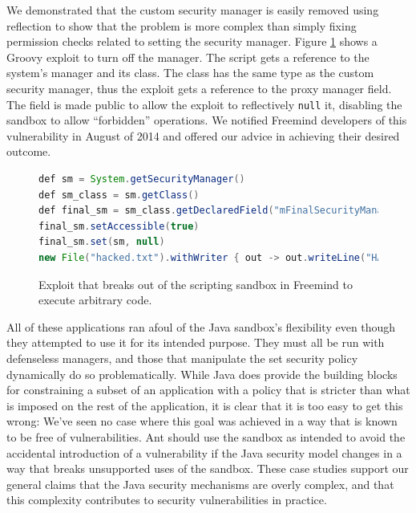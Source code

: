 \documentclass{sig-alternate}
\begin{document}
We demonstrated that the custom security manager is easily removed
using reflection to show that the problem is more complex than simply
fixing permission checks related to setting the security manager. Figure \ref{fig:Example-Exploit-for-Freemind}
shows a Groovy exploit to turn off the manager. The script gets a reference to the system's manager
and its class. The class has the same type as the custom security
manager, thus the exploit gets a reference to the proxy manager field.
The field is made public to allow the exploit to reflectively \texttt{null}
it, disabling the sandbox to allow ``forbidden'' operations.
We notified Freemind developers of this vulnerability in August of 2014 
and offered our advice in achieving
their desired outcome. 

\begin{figure}
\begin{lstlisting}[language=Java,basicstyle={\scriptsize},breaklines=true]
def sm = System.getSecurityManager() 
def sm_class = sm.getClass() 
def final_sm = sm_class.getDeclaredField("mFinalSecurityManager")
final_sm.setAccessible(true) 
final_sm.set(sm, null)
new File("hacked.txt").withWriter { out -> out.writeLine("HACKED!") }
\end{lstlisting}
\caption{Exploit that breaks out of the scripting sandbox in Freemind\label{fig:Example-Exploit-for-Freemind}
to execute arbitrary code.}
\end{figure}

All of these applications ran afoul of the Java sandbox's flexibility even
though they attempted to use it for its intended purpose. 
They must all be run with defenseless managers, and those that 
manipulate the set security policy dynamically do so problematically.  
While Java does provide the
building blocks for constraining a subset of an application with a policy that
is stricter than what is imposed on the rest of the application, it is clear
that it is too easy to get this wrong:  We've seen no case where this goal was
achieved in a way that is known to be free of vulnerabilities. Ant should use the sandbox as intended to avoid the accidental introduction of a vulnerability if the Java security model changes in a way that breaks unsupported uses of the sandbox. These case
studies support our general claims that the Java security mechanisms are overly
complex, and that this complexity contributes to security vulnerabilities in
practice.  
\end{document}
